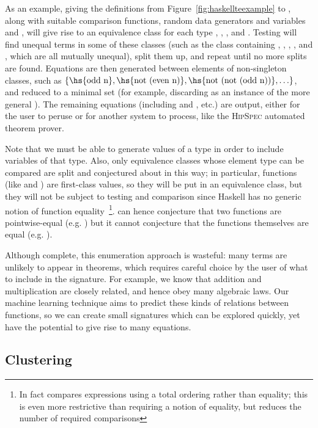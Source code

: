 As an example, giving the definitions from Figure~\ref{fig:haskellteexample} to
\qspec{}, along with suitable comparison functions, random data generators and
variables  and , will give rise to an equivalence
class for each type , , ,  and
. Testing will find unequal terms in some of these classes
(such as the  class containing , , ,
,  and , which are all mutually unequal), split
them up, and repeat until no more splits are found. Equations are then generated
between elements of non-singleton classes, such as $\{\text{\hs{odd n}},
\text{\hs{not (even n)}}, \text{\hs{not (not (odd n))}}, \ldots\}$, and reduced
to a minimal set (for example, discarding  as an
instance of the more general ). The remaining equations
(including  and , etc.) are
output, either for the user to peruse or for another system to process, like the
\textsc{HipSpec} automated theorem prover.

Note that we must be able to generate values of a type in order to include
variables of that type. Also, only equivalence classes whose element type can be
compared are split and conjectured about in this way; in particular, functions
(like  and ) are first-class values, so they will be put in an
equivalence class, but they will not be subject to testing and comparison since
Haskell has no generic notion of function equality~\footnote{In
  fact \qspec{} compares expressions using a total ordering rather than equality;
  this is even more restrictive than requiring a notion of equality, but reduces
  the number of required comparisons}. \qspec{} can hence conjecture that two
functions are pointwise-equal (e.g. ) but it cannot conjecture
that the functions themselves are equal (e.g. ).

Although complete, this enumeration approach is wasteful: many terms are
unlikely to appear in theorems, which requires careful choice by the user of
what to include in the signature. For example, we know that addition and
multiplication are closely related, and hence obey many algebraic laws. Our
machine learning technique aims to predict these kinds of relations between
functions, so we can create small signatures which can be explored quickly, yet
have the potential to give rise to many equations.

\subsection{Clustering}
\label{sec:clustering}

